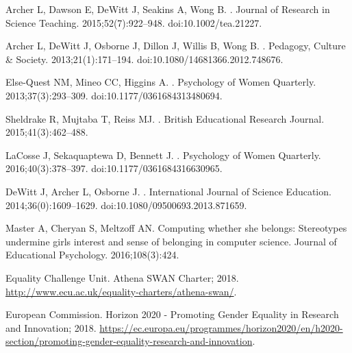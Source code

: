 \begin{thebibliography}{10}
Archer L, Dawson E, DeWitt J, Seakins A, Wong B.
.
\newblock Journal of Research in Science Teaching. 2015;52(7):922--948.
\newblock doi:{10.1002/tea.21227}.

Archer L, DeWitt J, Osborne J, Dillon J, Willis B, Wong B.
.
\newblock Pedagogy, Culture \& Society. 2013;21(1):171--194.
\newblock doi:{10.1080/14681366.2012.748676}.

Else-Quest NM, Mineo CC, Higgins A.
.
\newblock Psychology of Women Quarterly. 2013;37(3):293--309.
\newblock doi:{10.1177/0361684313480694}.

Sheldrake R, Mujtaba T, Reiss MJ.
.
\newblock British Educational Research Journal. 2015;41(3):462--488.

LaCosse J, Sekaquaptewa D, Bennett J.
.
\newblock Psychology of Women Quarterly. 2016;40(3):378--397.
\newblock doi:{10.1177/0361684316630965}.

DeWitt J, Archer L, Osborne J.
.
\newblock International Journal of Science Education. 2014;36(0):1609--1629.
\newblock doi:{10.1080/09500693.2013.871659}.

Master A, Cheryan S, Meltzoff AN.
\newblock Computing whether she belongs: Stereotypes undermine girls interest and sense of belonging in computer science.
\newblock Journal of Educational Psychology. 2016;108(3):424.

{Equality Challenge Unit}. Athena SWAN Charter; 2018.
\newblock \url{http://www.ecu.ac.uk/equality-charters/athena-swan/}.

{European Commission}. {Horizon 2020 - Promoting Gender Equality in Research and Innovation}; 2018.
\newblock
  \url{https://ec.europa.eu/programmes/horizon2020/en/h2020-section/promoting-gender-equality-research-and-innovation}.

\end{thebibliography}




